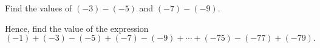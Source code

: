 \begin{subparts}
  \item Find the values of $(-3)-(-5)$ and $(-7)-(-9)$.

  \item Hence, find the value of the expression
    \[(-1)+(-3)-(-5)+(-7)-(-9)+\cdots+(-75)-(-77)+(-79).\]
\end{subparts}

